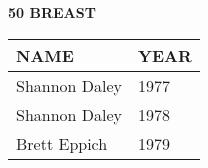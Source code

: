 \vspace{0.4cm}

\begin{center}
\begin{minipage}[t]{0.7\textwidth}
\centering
\textbf{50 BREAST}\\[0.05cm]
\begin{tabular}{@{}p{2.8cm}p{1.2cm}@{}}
\hline
\textbf{NAME} & \textbf{YEAR} \\
\hline
Shannon Daley & 1977 \\
Shannon Daley & 1978 \\
Brett Eppich & 1979 \\
\hline
\end{tabular}
\end{minipage}
\end{center}

\vspace{0.4cm}

